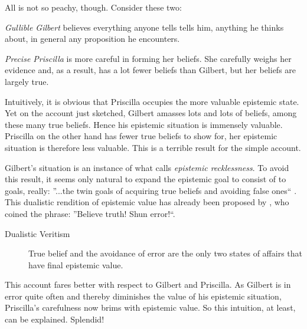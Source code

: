 \documentclass[12pt,numbers=noenddot]{scrartcl}
\begin{document}
All is not so peachy, though. Consider these two:

\emph{Gullible Gilbert} believes everything anyone tells tells him, anything he thinks about, in general any proposition he encounters.

\emph{Precise Priscilla} is more careful in forming her beliefs. She carefully weighs her evidence and, as a result, has a lot fewer beliefs than Gilbert, but her beliefs are largely true.

Intuitively, it is obvious that Priscilla occupies the more valuable epistemic state. Yet on the account just sketched, Gilbert amasses lots and lots of beliefs, among these many true beliefs. Hence his epistemic situation is immensely valuable. Priscilla on the other hand has fewer true beliefs to show for, her epistemic situation is therefore less valuable. This is a terrible result for the simple account.

Gilbert’s situation is an instance of what \textcite[360]{Berker2013-BERETA-2} calls \emph{epistemic recklessness}. To avoid this result, it seems only natural to expand the epistemic goal to consist of to goals, really: ”...the twin goals of acquiring true beliefs and avoiding false ones“ \parencite[339]{Berker2013-BERETA-2}. This dualistic rendition of epistemic value has already been proposed by \textcite[17]{James1896-JAMTWT-19}, who coined the phrase: ”Believe truth! Shun error!“.

\begin{description}
    \item[Dualistic Veritism] True belief and the avoidance of error are the only two states of affairs that have final epistemic value.
\end{description}

This account fares better with respect to Gilbert and Priscilla. As Gilbert is in error quite often and thereby diminishes the value of his epistemic situation, Priscilla’s carefulness now brims with epistemic value. So this intuition, at least, can be explained. Splendid!
\end{document}
